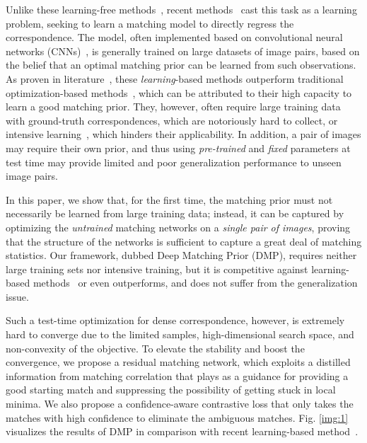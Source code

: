 \documentclass[10pt,twocolumn,letterpaper]{article}
\newcommand{\figref}[1]{Fig. \ref{#1}}
\begin{document}
Unlike these learning-free methods~\cite{liu2010sift,taniai2016joint,ham2016proposal,kim2017dctm}, recent methods~\cite{rocco2017convolutional,Sun_2018_CVPR,shen2019self,melekhov2019dgc,truong2020glu} cast this task as a learning problem, seeking to learn a matching model to directly regress the correspondence. The model, often implemented based on convolutional neural networks (CNNs)~\cite{simonyan2014very,he2016deep}, is generally trained on large datasets of image pairs, based on the belief that an optimal matching prior can be learned from such observations. As proven in literature~\cite{melekhov2019dgc,truong2020glu}, these \emph{learning}-based methods outperform traditional optimization-based methods~\cite{liu2010sift,ham2016proposal,kim2017dctm}, which can be attributed to their high capacity to learn a good matching prior. They, however, often require large training data with ground-truth correspondences, which are notoriously hard to collect, or intensive learning~\cite{melekhov2019dgc,truong2020glu}, which hinders their applicability. In addition, a pair of images may require their own prior, and thus using \emph{pre-trained} and \emph{fixed} parameters at test time may provide limited and poor generalization performance to unseen image pairs.

In this paper, we show that, for the first time, the matching prior must not necessarily be learned from large training data; instead, it can be captured by optimizing the \emph{untrained} matching networks on a \emph{single pair of images}, proving that the structure of the networks is sufficient to capture a great deal of matching statistics. 
Our framework, dubbed Deep Matching Prior (DMP), requires neither large training sets nor intensive training, but it is competitive against learning-based methods~\cite{rocco2017convolutional,Sun_2018_CVPR,melekhov2019dgc,shen2019self,truong2020glu,shen2020ransac} or even outperforms, and does not suffer from the generalization issue. 

Such a test-time optimization for dense correspondence, however, is extremely hard to converge due to the limited samples, high-dimensional search space, and non-convexity of the objective. To elevate the stability and boost the convergence, we propose a residual matching network, which exploits a distilled information from matching correlation that plays as a guidance for providing a good starting match and suppressing the possibility of getting stuck in local minima. We also propose a confidence-aware contrastive loss that only takes the matches with high confidence to eliminate the ambiguous matches. \figref{img:1} visualizes the results of DMP in comparison with recent learning-based method~\cite{truong2020glu}. 
\end{document}

